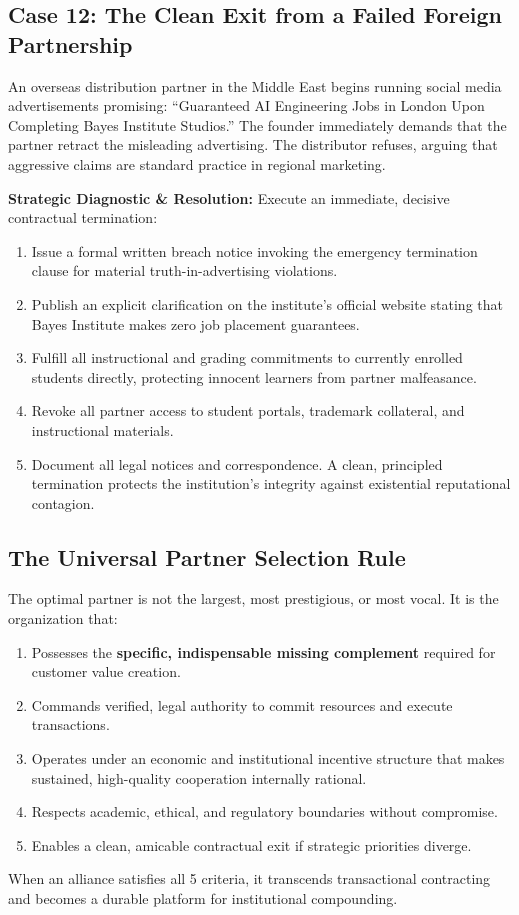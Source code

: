 \subsection{Case 12: The Clean Exit from a Failed Foreign Partnership}
\label{sec:case12_clean_exit_failed_partnership}

An overseas distribution partner in the Middle East begins running social media advertisements promising: ``Guaranteed AI Engineering Jobs in London Upon Completing Bayes Institute Studios.'' The founder immediately demands that the partner retract the misleading advertising. The distributor refuses, arguing that aggressive claims are standard practice in regional marketing.

\textbf{Strategic Diagnostic \& Resolution:} Execute an immediate, decisive contractual termination:
\begin{enumerate}
\item Issue a formal written breach notice invoking the emergency termination clause for material truth-in-advertising violations.
\item Publish an explicit clarification on the institute's official website stating that Bayes Institute makes zero job placement guarantees.
\item Fulfill all instructional and grading commitments to currently enrolled students directly, protecting innocent learners from partner malfeasance.
\item Revoke all partner access to student portals, trademark collateral, and instructional materials.
\item Document all legal notices and correspondence. A clean, principled termination protects the institution's integrity against existential reputational contagion.
\end{enumerate}

\subsection{The Universal Partner Selection Rule}
\label{sec:universal_partner_selection_rule}

The optimal partner is not the largest, most prestigious, or most vocal. It is the organization that:
\begin{enumerate}
\item Possesses the \textbf{specific, indispensable missing complement} required for customer value creation.
\item Commands verified, legal authority to commit resources and execute transactions.
\item Operates under an economic and institutional incentive structure that makes sustained, high-quality cooperation internally rational.
\item Respects academic, ethical, and regulatory boundaries without compromise.
\item Enables a clean, amicable contractual exit if strategic priorities diverge.
\end{enumerate}
When an alliance satisfies all 5 criteria, it transcends transactional contracting and becomes a durable platform for institutional compounding.
